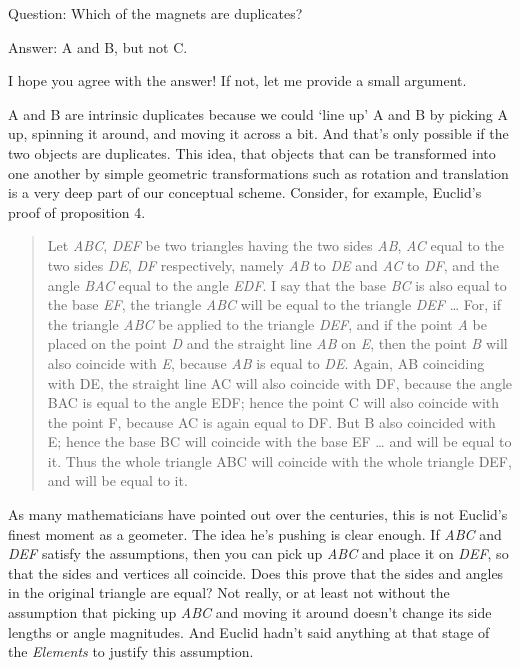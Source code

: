 Question: Which of the magnets are duplicates?

Answer: A and B, but not C.

I hope you agree with the answer! If not, let me provide a small argument.

A and B are intrinsic duplicates because we could `line up' A and B by picking A up, spinning it around, and moving it across a bit. And that's only possible if the two objects are duplicates. This idea, that objects that can be transformed into one another by simple geometric transformations such as rotation and translation is a very deep part of our conceptual scheme. Consider, for example, Euclid's proof of proposition 4. 

\begin{quote}
Let \textit{ABC}, \textit{DEF} be two triangles having the two sides \textit{AB}, \textit{AC} equal to the two sides \textit{DE}, \textit{DF} respectively, namely \textit{AB} to \textit{DE} and \textit{AC} to \textit{DF}, and the angle \textit{BAC} equal to the angle \textit{EDF}. I say that the base \textit{BC} is also equal to the base \textit{EF}, the triangle \textit{ABC} will be equal to the triangle \textit{DEF} {\dots} For, if the triangle \textit{ABC} be applied to the triangle \textit{DEF}, and if the point \textit{A} be placed on the point \textit{D} and the straight line \textit{AB} on \textit{E}, then the point \textit{B} will also coincide with \textit{E}, because \textit{AB} is equal to \textit{DE}. Again, AB coinciding with DE, the straight line AC will also coincide with DF, because the angle BAC is equal to the angle EDF; hence the point C will also coincide with the point F, because AC is again equal to DF. But B also coincided with E; hence the base BC will coincide with the base EF {\dots} and will be equal to it. Thus the whole triangle ABC will coincide with the whole triangle DEF, and will be equal to it. \cite[247-8]{Euclid1956}
\end{quote}

As many mathematicians have pointed out over the centuries, this is not Euclid's finest moment as a geometer. The idea he's pushing is clear enough. If \textit{ABC} and \textit{DEF} satisfy the assumptions, then you can pick up \textit{ABC} and place it on \textit{DEF}, so that the sides and vertices all coincide. Does this prove that the sides and angles in the original triangle are equal? Not really, or at least not without the assumption that picking up \textit{ABC} and moving it around doesn't change its side lengths or angle magnitudes. And Euclid hadn't said anything at that stage of the\textit{ Elements} to justify this assumption.

